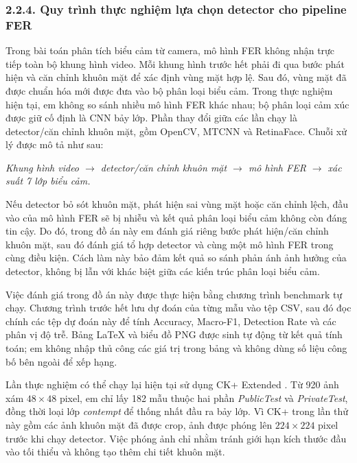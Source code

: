 \subsubsection*{2.2.4. Quy trình thực nghiệm lựa chọn detector cho pipeline FER}

Trong bài toán phân tích biểu cảm từ camera, mô hình FER không nhận trực tiếp toàn bộ khung hình video. Mỗi khung hình trước hết phải đi qua bước phát hiện và căn chỉnh khuôn mặt để xác định vùng mặt hợp lệ. Sau đó, vùng mặt đã được chuẩn hóa mới được đưa vào bộ phân loại biểu cảm. Trong thực nghiệm hiện tại, em không so sánh nhiều mô hình FER khác nhau; bộ phân loại cảm xúc được giữ cố định là CNN bảy lớp. Phần thay đổi giữa các lần chạy là detector/căn chỉnh khuôn mặt, gồm OpenCV, MTCNN và RetinaFace. Chuỗi xử lý được mô tả như sau:
\begin{center}
\textit{Khung hình video $\rightarrow$ detector/căn chỉnh khuôn mặt $\rightarrow$ mô hình FER $\rightarrow$ xác suất 7 lớp biểu cảm.}
\end{center}

Nếu detector bỏ sót khuôn mặt, phát hiện sai vùng mặt hoặc căn chỉnh lệch, đầu vào của mô hình FER sẽ bị nhiễu và kết quả phân loại biểu cảm không còn đáng tin cậy. Do đó, trong đồ án này em đánh giá riêng bước phát hiện/căn chỉnh khuôn mặt, sau đó đánh giá tổ hợp detector và cùng một mô hình FER trong cùng điều kiện. Cách làm này bảo đảm kết quả so sánh phản ánh ảnh hưởng của detector, không bị lẫn với khác biệt giữa các kiến trúc phân loại biểu cảm.

Việc đánh giá trong đồ án này được thực hiện bằng chương trình benchmark tự chạy. Chương trình trước hết lưu dự đoán của từng mẫu vào tệp CSV, sau đó đọc chính các tệp dự đoán này để tính Accuracy, Macro-F1, Detection Rate và các phân vị độ trễ. Bảng LaTeX và biểu đồ PNG được sinh tự động từ kết quả tính toán; em không nhập thủ công các giá trị trong bảng và không dùng số liệu công bố bên ngoài để xếp hạng.

Lần thực nghiệm có thể chạy lại hiện tại sử dụng CK+ Extended \cite{lucey2010ckplus}. Từ 920 ảnh xám $48 \times 48$ pixel, em chỉ lấy 182 mẫu thuộc hai phần \textit{PublicTest} và \textit{PrivateTest}, đồng thời loại lớp \textit{contempt} để thống nhất đầu ra bảy lớp. Vì CK+ trong lần thử này gồm các ảnh khuôn mặt đã được crop, ảnh được phóng lên $224 \times 224$ pixel trước khi chạy detector. Việc phóng ảnh chỉ nhằm tránh giới hạn kích thước đầu vào tối thiểu và không tạo thêm chi tiết khuôn mặt.

